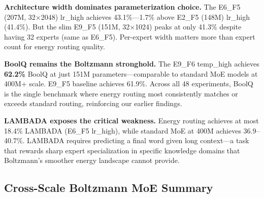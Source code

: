 \documentclass[oneside]{article}
\begin{document}
\textbf{Architecture width dominates parameterization choice.} The E6\_F5 (207M, 32$\times$2048) lr\_high achieves 43.1\%---1.7\% above E2\_F5 (148M) lr\_high (41.4\%). But the slim E9\_F5 (151M, 32$\times$1024) peaks at only 41.3\% despite having 32 experts (same as E6\_F5). Per-expert width matters more than expert count for energy routing quality.

\textbf{BoolQ remains the Boltzmann stronghold.} The E9\_F6 temp\_high achieves \textbf{62.2\%} BoolQ at just 151M parameters---comparable to standard MoE models at 400M+ scale. E9\_F5 baseline achieves 61.9\%. Across all 48 experiments, BoolQ is the single benchmark where energy routing most consistently matches or exceeds standard routing, reinforcing our earlier findings.

\textbf{LAMBADA exposes the critical weakness.} Energy routing achieves at most 18.4\% LAMBADA (E6\_F5 lr\_high), while standard MoE at 400M achieves 36.9--40.7\%. LAMBADA requires predicting a final word given long context---a task that rewards sharp expert specialization in specific knowledge domains that Boltzmann's smoother energy landscape cannot provide.


\subsection{Cross-Scale Boltzmann MoE Summary}
\label{sec:moe_summary}
\end{document}
